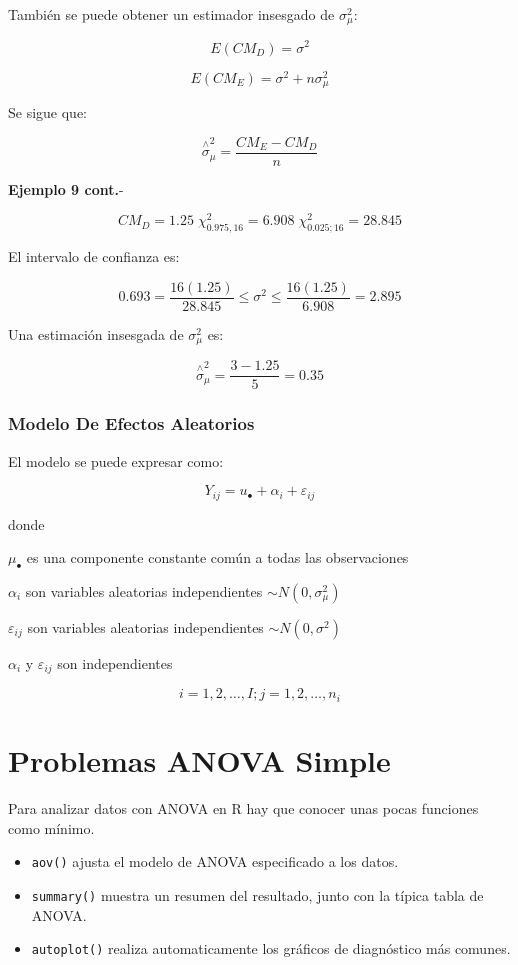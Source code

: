 \documentclass[]{book}
\providecommand{\tightlist}{%
  \setlength{\itemsep}{0pt}\setlength{\parskip}{0pt}}
\theoremstyle{definition}
\theoremstyle{definition}
\theoremstyle{definition}
\theoremstyle{remark}
\begin{document}
También se puede obtener un estimador insesgado de \(\sigma_{\mu}^{2}\):

\[
E(CM_D) = \sigma^{2}
\]

\[
E(CM_E) = \sigma^{2} + n\sigma_{\mu}^{2}
\]

Se sigue que:

\[
{\overset{\land}{\sigma}}_{\mu}^{2} = \frac{CM_E - CM_D}{n}
\]

\textbf{Ejemplo 9 cont.}-

\[
CM_D = 1.25\; \chi_{0.975,16}^{2} = 6.908\; \chi_{0.025;16}^{2} = 28.845
\]

El intervalo de confianza es:

\[
0.693 = \frac{16\left( 1.25 \right)}{28.845} \leq \sigma^{2} \leq \frac{16\left( 1.25 \right)}{6.908} = 2.895
\]

Una estimación insesgada de \(\sigma_{\mu}^{2}\) es:

\[
{\overset{\land}{\sigma}}_{\mu}^{2} = \frac{3 - 1.25}{5} = 0.35
\]

\hypertarget{modelo-de-efectos-aleatorios}{%
\subsection{Modelo De Efectos
Aleatorios}\label{modelo-de-efectos-aleatorios}}

El modelo se puede expresar como:

\[
Y_{ij} = u_{\bullet} + \alpha_{i} + \varepsilon_{ij}
\]

donde

\(\mu_{\bullet}\) es una componente constante común a todas las
observaciones

\(\alpha_{i}\) son variables aleatorias independientes
\(\sim N(0,\sigma_{\mu}^{2})\)

\(\varepsilon_{ij}\) son variables aleatorias independientes
\(\sim N(0,\sigma^{2})\)

\(\alpha_{i}\) y \(\varepsilon_{ij}\) son independientes

\[
i = 1,2,\ldots,I;j = 1,2,\ldots,n_{i}
\]

\hypertarget{problemas-anova-simple}{%
\chapter{Problemas ANOVA Simple}\label{problemas-anova-simple}}

Para analizar datos con ANOVA en R hay que conocer unas pocas funciones
como mínimo.

\begin{itemize}
\tightlist
\item
  \texttt{aov()} ajusta el modelo de ANOVA especificado a los datos.
\item
  \texttt{summary()} muestra un resumen del resultado, junto con la
  típica tabla de ANOVA.
\item
  \texttt{autoplot()} realiza automaticamente los gráficos de
  diagnóstico más comunes.
\end{itemize}
\end{document}
